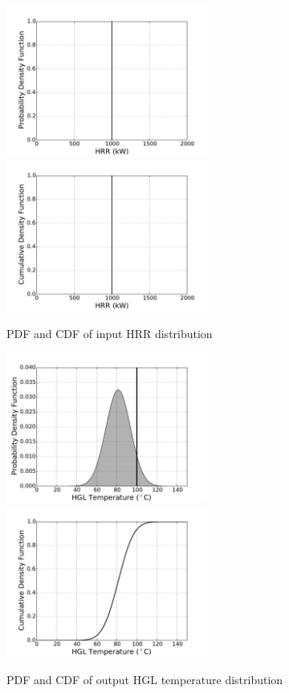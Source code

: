 \documentclass[12pt]{article}
\begin{document}
\begin{figure}[!ht]
\includegraphics[width=2.6in]{Figures/input_PDF_point}
\includegraphics[width=2.6in]{Figures/input_CDF_point}
\caption{PDF and CDF of input HRR distribution}
\label{fig:case_1_input_distributions}
\end{figure}

\begin{figure}[!ht]
\includegraphics[width=2.6in]{Figures/output_PDF_1_model}
\includegraphics[width=2.6in]{Figures/output_CDF_1_model}
\caption{PDF and CDF of output HGL temperature distribution}
\label{fig:case_1_output_distributions}
\end{figure}
\end{document}
